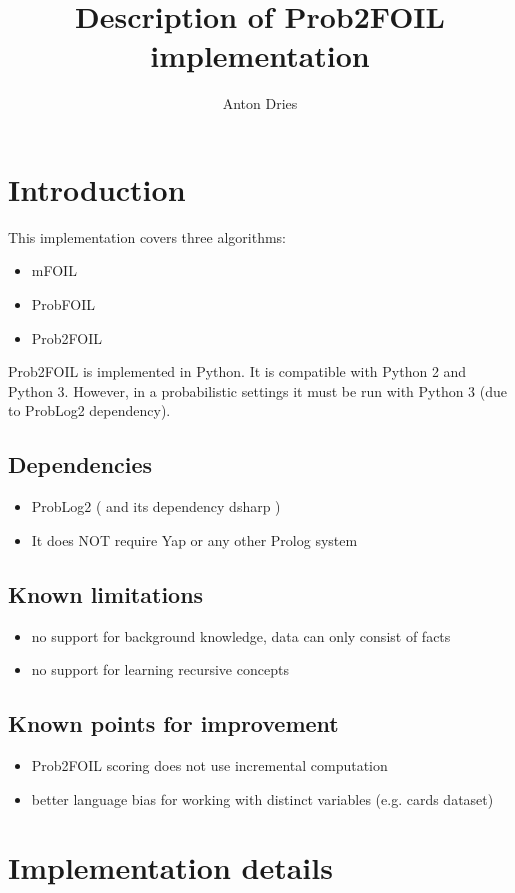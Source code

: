 \documentclass{article}
\title{Description of Prob2FOIL implementation}
\author{Anton Dries}
\begin{document}
\section{Introduction}

This implementation covers three algorithms:
\begin{itemize}
	\item mFOIL
	\item ProbFOIL
	\item Prob2FOIL
\end{itemize}

Prob2FOIL is implemented in Python. 
It is compatible with Python 2 and Python 3.
However, in a probabilistic settings it must be run with Python 3 (due to ProbLog2 dependency).

\subsection{Dependencies}

\begin{itemize}
	\item ProbLog2 ( and its dependency dsharp )
	\item It does NOT require Yap or any other Prolog system	
\end{itemize}


\subsection{Known limitations}

\begin{itemize}
	\item no support for background knowledge, data can only consist of facts
	\item no support for learning recursive concepts
\end{itemize}

\subsection{Known points for improvement}

\begin{itemize}
	\item Prob2FOIL scoring does not use incremental computation
	\item better language bias for working with distinct variables (e.g. cards dataset)
\end{itemize}

\section{Implementation details}
\end{document}

